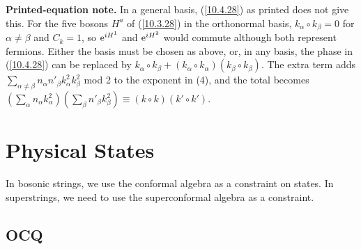 \begin{tcolorbox}[breakable]
\begin{remark}
			\textbf{Printed-equation note.} In a general basis, (\ref{10.4.28}) as printed does not give this. For the five bosons $H^a$ of (\ref{10.3.28}) in the orthonormal basis, $k_\alpha\circ k_\beta=0$ for $\alpha\ne\beta$ and $C_k=1$, so $\mathrm{e}^{i H^1}$ and $\mathrm{e}^{i H^2}$ would commute although both represent fermions. Either the basis must be chosen as above, or, in any basis, the phase in (\ref{10.4.28}) can be replaced by $k_\alpha\circ k_\beta+(k_\alpha\circ k_\alpha)(k_\beta\circ k_\beta)$. The extra term adds $\sum_{\alpha\neq\beta}n_\alpha n'_\beta k_\alpha^{2}k_\beta^{2}$ mod 2 to the exponent in (4), and the total becomes $(\sum_\alpha n_\alpha k_\alpha^{2})(\sum_\beta n'_\beta k_\beta^{2})\equiv(k\circ k)(k'\circ k')$.
		\end{remark}
	\end{tcolorbox}
	
	\section{Physical States}
	
	In bosonic strings, we use the conformal algebra as a constraint on states. In superstrings, we need to use the superconformal algebra as a constraint.
	
	\subsection*{OCQ}
	
